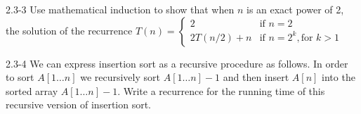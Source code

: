 \begin{problem}{2.3-3}
Use mathematical induction to show that when $n$ is an exact power of 2, the solution of the recurrence
  $T(n) = \begin{cases}
    2 & \text{if } n = 2 \\
    2T(n/2) + n & \text{if } n = 2^k, \text{for } k >1
  \end{cases}
  $
\end{problem}

\begin{problem}{2.3-4}
  We can express insertion sort as a recursive procedure as follows. In order to sort $A[1\ldots n]$ we recursively sort
  $A[1\ldots n] - 1 $ and then insert $A[n]$ into the sorted array $A[1\ldots n] - 1 $.
  Write a recurrence for the running time of this recursive version of insertion sort.
\end{problem}


